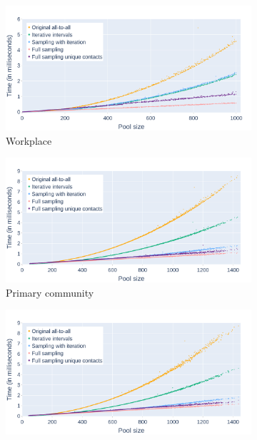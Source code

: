\begin{figure}
    \centering
    \begin{subfigure}{.8\linewidth}
        \centering
        \includegraphics[width=\textwidth]{4 - Sampling/fig/full_sampling_unique_contacts/times_avg_fsuc_workplace_full.png}
        \caption{Workplace}
        \label{fig:times_avg_fsuc_workplace_full}
    \end{subfigure}
    \begin{subfigure}{.8\linewidth}
        \centering
        \includegraphics[width=\textwidth]{4 - Sampling/fig/full_sampling_unique_contacts/times_avg_fsuc_primary_full.png}
        \caption{Primary community}
        \label{fig:times_avg_fsuc_primary_full}
    \end{subfigure}
    \begin{subfigure}{.8\linewidth}
        \centering
        \includegraphics[width=\textwidth]{4 - Sampling/fig/full_sampling_unique_contacts/times_avg_fsuc_secondary_full.png}

\end{subfigure}
\end{figure}
